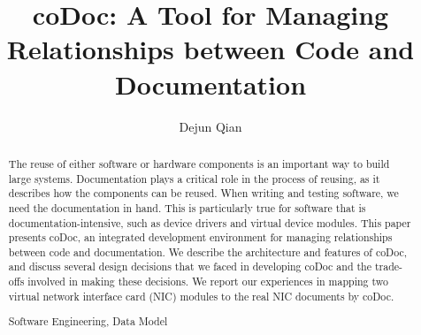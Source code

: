\documentclass[runningheads,a4paper]{llncs}
\newcommand{\keywords}[1]{\par\addvspace\baselineskip
\noindent\keywordname\enspace\ignorespaces#1}
\begin{document}
\mainmatter  %

\title{coDoc: A Tool for Managing Relationships between Code and Documentation}


%
%
\author{Dejun Qian}
%


%
%

\maketitle


\begin{abstract}
The reuse of either software or hardware components is an important way to build large systems.
Documentation plays a critical role in the process of reusing,
as it describes how the components can be reused.
When writing and testing software, 
we need the documentation in hand.
This is particularly true for software that is documentation-intensive, 
such as device drivers and virtual device modules.
This paper presents coDoc, 
an integrated development environment for managing relationships between code and documentation.
We describe the architecture and features of coDoc,
and discuss several design decisions that we faced in developing coDoc and the trade-offs involved in making these decisions.
We report our experiences in mapping two virtual network interface card (NIC) modules to the real NIC documents by coDoc.
\keywords{Software Engineering, Data Model}
\end{abstract}
\end{document}

